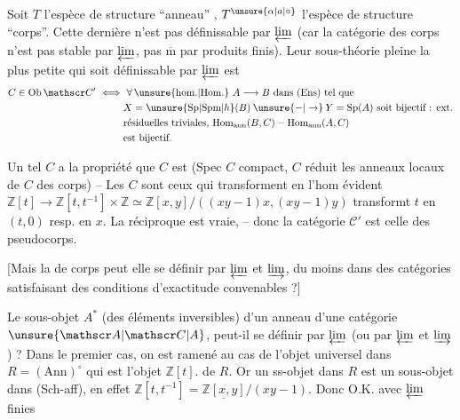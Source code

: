  Soit $T$ l'espèce de structure ``anneau'' , $T^{\unsure{\alpha|a|\circ}}$ l'espèce de structure ``corps''. Cette dernière n'est pas définissable par $\varprojlim$ (car la catégorie des corps  n'est pas stable par $\varprojlim$, pas $\overline{\mathrm m}$ par produits finis). Leur sous-théorie pleine  la plus petite qui soit définissable par $\varprojlim$ est 
\[
\begin{aligned}
C\in\mathrm{Ob}\,\mathscr C'\ \Longleftrightarrow{}&
 \ \forall\,\unsure{\mathrm{hom.}|\mathrm{Hom.}}\ A\longrightarrow B\text{ dans }(\mathrm{Ens})\text{ tel que}\\
&X=\unsure{\mathrm{Sp}|\mathrm{Spm}|h}(B)\mathbin{\unsure{-|\to}}Y=\mathrm{Sp}(A)\text{ soit bijectif : ext.}\\
&\text{résiduelles triviales, }\mathrm{Hom}_{\mathrm{ann}}(B,C)\mathbin{-}\mathrm{Hom}_{\mathrm{ann}}(A,C)\\
&\text{est bijectif.}
\end{aligned}
\]

Un tel $C$ a la propriété que $C$ est  (Spec $C$  compact,  $C$ réduit \deleted{$\Longleftrightarrow$} les  anneaux locaux de $C$ des corps) -- Les $C$ sont ceux qui transforment en  l'hom évident $\mathbb Z[t]\longrightarrow\mathbb Z[t,t^{-1}]\times\mathbb Z\simeq\mathbb Z[x,y]/((xy-1)x,(xy-1)y)$ transformt $t$ en $(t,0)$ resp. en $x$. La réciproque est vraie,  -- donc la catégorie  $\mathscr C'$ est celle des pseudocorps.

[Mais la  de corps peut elle se définir par $\varprojlim$ et $\varinjlim$, du moins dans des catégories satisfaisant des conditions d'exactitude convenables ?]

Le sous-objet $A^\ast$ (des éléments inversibles) d'un  anneau d'une catégorie $\unsure{\mathscr A|\mathscr C|A}$, peut-il se définir par $\varprojlim$ (ou par $\varprojlim$ et $\varinjlim$) ? Dans le premier cas, on est ramené au cas de l'objet universel dans $R=(\mathrm{Ann})^\circ$  qui est l'objet $\mathbb Z[t]$.
de $R$.  Or un ss-objet dans $R$ est un  sous-objet dans (Sch-aff), en effet $\mathbb Z[t,t^{-1}]=\underline{\mathbb Z[x,y]}/(xy-1)$. Donc O.K.  avec $\varprojlim$ finies

